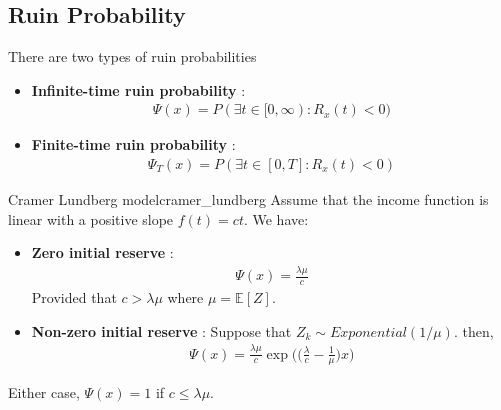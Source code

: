 \subsection{Ruin Probability}
\begin{definition}
    There are two types of ruin probabilities
    \begin{itemize}
        \item \textbf{Infinite-time ruin probability} :
        \begin{align*}
            \Psi(x) = P(\exists t \in [0, \infty) : R_x(t) < 0)
        \end{align*}

        \item \textbf{Finite-time ruin probability} :
        \begin{align*}
            \Psi_T(x) = P(\exists t \in [0, T]:R_x(t) < 0)
        \end{align*}
    \end{itemize}
\end{definition}

\begin{theorem}{Cramer Lundberg model}{cramer_lundberg}
    Assume that the income function is linear with a positive slope $f(t) = ct$. We have:
    \begin{itemize}
        \item \textbf{Zero initial reserve} : 
        \begin{align*}
            \Psi(x) = \frac{\lambda\mu}{c}
        \end{align*}
        \noindent Provided that $c > \lambda\mu$ where $\mu = \mathbb{E}[Z]$. 

        \item \textbf{Non-zero initial reserve} : Suppose that $Z_k \sim Exponential(1/\mu)$. then,
        \begin{align*}
            \Psi(x) = \frac{\lambda \mu}{c}\exp\Bigg(\Bigg( \frac{\lambda}{c} - \frac{1}{\mu} \Bigg)x\Bigg)
        \end{align*}
    \end{itemize}

    \noindent Either case, $\Psi(x)=1$ if $c \le \lambda \mu$.
\end{theorem}


